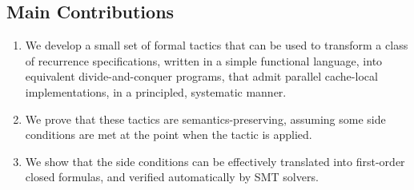 \begin{figure}
\caption{\label{intro:coz speedup}}
\end{figure}

\subsection{Main Contributions}

\begin{enumerate}
  \item We develop a small set of formal tactics that can be used to transform a class of recurrence
  specifications, written in a simple functional language, 
  into equivalent divide-and-conquer programs, that admit parallel cache-local
  implementations, in a principled, systematic manner.
  \item We prove that these tactics are semantics-preserving, assuming some side conditions are met
  at the point when the tactic is applied.
  \item We show that the side conditions can be effectively translated into first-order closed
  formulas, and verified automatically by SMT solvers.
\end{enumerate}

